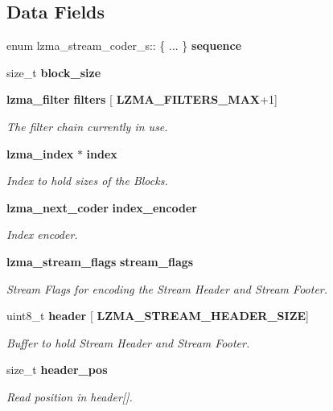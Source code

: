 \subsection*{Data Fields}
\begin{DoxyCompactItemize}
\item 
\mbox{\label{structlzma__stream__coder__s_a15e723e7d4a8a01eed6395380504272b}} 
enum lzma\+\_\+stream\+\_\+coder\+\_\+s\+:: \{ ... \}  {\bfseries sequence}
\item 
size\+\_\+t \textbf{ block\+\_\+size}
\item 
\textbf{ lzma\+\_\+filter} \textbf{ filters} [\textbf{ L\+Z\+M\+A\+\_\+\+F\+I\+L\+T\+E\+R\+S\+\_\+\+M\+AX}+1]
\begin{DoxyCompactList}\small\item\em The filter chain currently in use. \end{DoxyCompactList}\item 
\textbf{ lzma\+\_\+index} $\ast$ \textbf{ index}
\begin{DoxyCompactList}\small\item\em Index to hold sizes of the Blocks. \end{DoxyCompactList}\item 
\textbf{ lzma\+\_\+next\+\_\+coder} \textbf{ index\+\_\+encoder}
\begin{DoxyCompactList}\small\item\em Index encoder. \end{DoxyCompactList}\item 
\textbf{ lzma\+\_\+stream\+\_\+flags} \textbf{ stream\+\_\+flags}
\begin{DoxyCompactList}\small\item\em Stream Flags for encoding the Stream Header and Stream Footer. \end{DoxyCompactList}\item 
uint8\+\_\+t \textbf{ header} [\textbf{ L\+Z\+M\+A\+\_\+\+S\+T\+R\+E\+A\+M\+\_\+\+H\+E\+A\+D\+E\+R\+\_\+\+S\+I\+ZE}]
\begin{DoxyCompactList}\small\item\em Buffer to hold Stream Header and Stream Footer. \end{DoxyCompactList}\item 
size\+\_\+t \textbf{ header\+\_\+pos}
\begin{DoxyCompactList}\small\item\em Read position in header[]. \end{DoxyCompactList}\item 

\end{DoxyCompactItemize}
